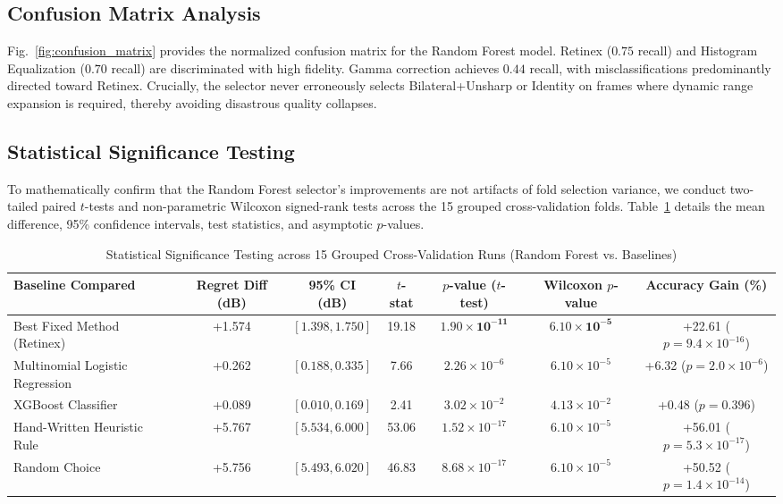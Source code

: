 \documentclass[journal]{IEEEtran}
\begin{document}
\subsection{Confusion Matrix Analysis}
Fig.~\ref{fig:confusion_matrix} provides the normalized confusion matrix for the Random Forest model. Retinex ($0.75$ recall) and Histogram Equalization ($0.70$ recall) are discriminated with high fidelity. Gamma correction achieves $0.44$ recall, with misclassifications predominantly directed toward Retinex. Crucially, the selector never erroneously selects Bilateral+Unsharp or Identity on frames where dynamic range expansion is required, thereby avoiding disastrous quality collapses.

\subsection{Statistical Significance Testing}
To mathematically confirm that the Random Forest selector's improvements are not artifacts of fold selection variance, we conduct two-tailed paired $t$-tests and non-parametric Wilcoxon signed-rank tests across the 15 grouped cross-validation folds. Table~\ref{tab:significance} details the mean difference, 95\% confidence intervals, test statistics, and asymptotic $p$-values.

\begin{table}[!t]
\centering
\caption{Statistical Significance Testing across 15 Grouped Cross-Validation Runs (Random Forest vs. Baselines)}
\label{tab:significance}
\begin{tabular}{lcccccc}
\toprule
\textbf{Baseline Compared} & \textbf{Regret Diff (dB)} & \textbf{95\% CI (dB)} & \textbf{$t$-stat} & \textbf{$p$-value ($t$-test)} & \textbf{Wilcoxon $p$-value} & \textbf{Accuracy Gain (\%)} \\
\midrule
Best Fixed Method (Retinex) & +1.574 & $[1.398, 1.750]$ & 19.18 & $\mathbf{1.90 \times 10^{-11}}$ & $\mathbf{6.10 \times 10^{-5}}$ & +22.61 ($p=9.4 \times 10^{-16}$) \\
Multinomial Logistic Regression & +0.262 & $[0.188, 0.335]$ & 7.66 & $2.26 \times 10^{-6}$ & $6.10 \times 10^{-5}$ & +6.32 ($p=2.0 \times 10^{-6}$) \\
XGBoost Classifier & +0.089 & $[0.010, 0.169]$ & 2.41 & $3.02 \times 10^{-2}$ & $4.13 \times 10^{-2}$ & +0.48 ($p=0.396$) \\
Hand-Written Heuristic Rule & +5.767 & $[5.534, 6.000]$ & 53.06 & $1.52 \times 10^{-17}$ & $6.10 \times 10^{-5}$ & +56.01 ($p=5.3 \times 10^{-17}$) \\
Random Choice & +5.756 & $[5.493, 6.020]$ & 46.83 & $8.68 \times 10^{-17}$ & $6.10 \times 10^{-5}$ & +50.52 ($p=1.4 \times 10^{-14}$) \\
\bottomrule
\end{tabular}
\end{table}
\end{document}
